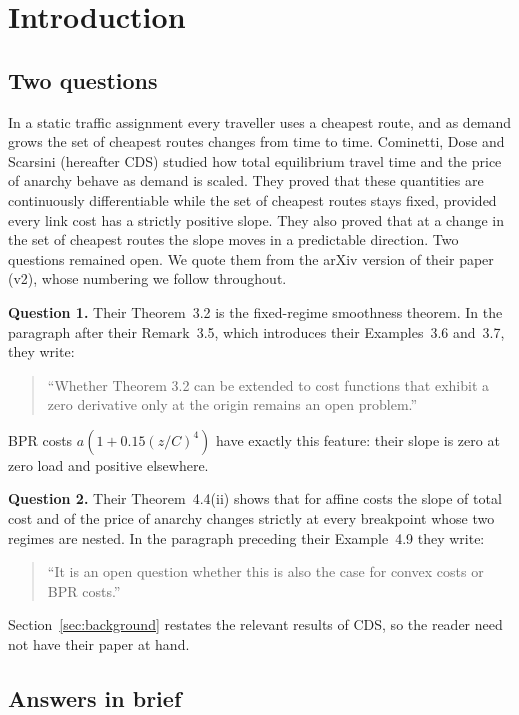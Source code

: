 \section{Introduction}\label{sec:intro}

\subsection{Two questions}

In a static traffic assignment every traveller uses a cheapest route, and as demand grows the set of cheapest routes changes from time to time. Cominetti, Dose and Scarsini \cite{CDS2024} (hereafter CDS) studied how total equilibrium travel time and the price of anarchy behave as demand is scaled. They proved that these quantities are continuously differentiable while the set of cheapest routes stays fixed, provided every link cost has a strictly positive slope. They also proved that at a change in the set of cheapest routes the slope moves in a predictable direction. Two questions remained open. We quote them from the arXiv version of their paper (v2), whose numbering we follow throughout.

\textbf{Question 1.} Their Theorem~3.2 is the fixed-regime smoothness theorem. In the paragraph after their Remark~3.5, which introduces their Examples~3.6 and~3.7, they write:
\begin{quote}
``Whether Theorem 3.2 can be extended to cost functions that exhibit a zero derivative only at the origin remains an open problem.''
\end{quote}
BPR costs $a(1+0.15(z/C)^4)$ have exactly this feature: their slope is zero at zero load and positive elsewhere.

\textbf{Question 2.} Their Theorem~4.4(ii) shows that for affine costs the slope of total cost and of the price of anarchy changes strictly at every breakpoint whose two regimes are nested. In the paragraph preceding their Example~4.9 they write:
\begin{quote}
``It is an open question whether this is also the case for convex costs or BPR costs.''
\end{quote}
Section~\ref{sec:background} restates the relevant results of CDS, so the reader need not have their paper at hand.

\subsection{Answers in brief}

